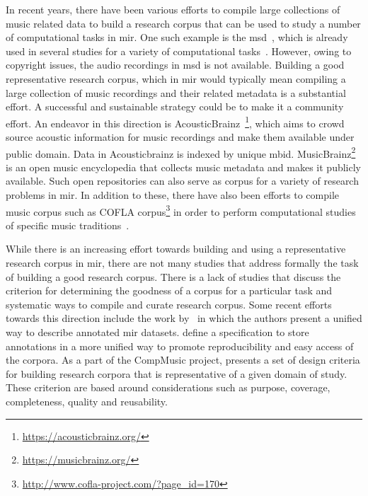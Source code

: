 In recent years, there have been various efforts to compile large collections of music related data to build a research corpus that can be used to study a number of computational tasks in \gls{mir}. One such example is the \gls{msd}~\citep{Bertin-Mahieux2011}, which is already used in several studies for a variety of computational tasks~\citep{serra2012measuring,sturm2012survey}. However, owing to copyright issues, the audio recordings in \gls{msd} is not available. Building a good representative research corpus, which in \gls{mir} would typically mean compiling a large collection of music recordings and their related metadata is a substantial effort. A successful and sustainable strategy could be to make it a community effort. An endeavor in this direction is AcousticBrainz~\citep{porter2015acousticbrainz}\footnote{\url{https://acousticbrainz.org/}}, which aims to crowd source acoustic information for music recordings and make them available under public domain. Data in Acousticbrainz is indexed by unique \gls{mbid}. MusicBrainz\footnote{\url{https://musicbrainz.org/}} is an open music encyclopedia that collects music metadata and makes it publicly available. Such open repositories can also serve as corpus for a variety of research problems in \gls{mir}. In addition to these, there have also been efforts to compile music corpus such as COFLA corpus\footnote{\url{http://www.cofla-project.com/?page_id=170}} in order to perform computational studies of specific music traditions~\citep{kroher2016corpus}.

While there is an increasing effort towards building and using a representative research corpus in \gls{mir}, there are not many studies that address formally the task of building a good research corpus. There is a lack of studies that discuss the criterion for determining the goodness of a corpus for a particular task and systematic ways to compile and curate research corpus. Some recent efforts towards this direction include the work by~\cite{peeters2012towards} in which the authors present a unified way to describe annotated \Gls{mir} datasets. \cite{Humphrey:JAMS:ISMIR:14} define a specification to store annotations in a more unified way to promote reproducibility and easy access of the corpora. As a part of the CompMusic project, \cite{serra:14:corpus} presents a set of design criteria for building research corpora that is representative of a given domain of study. These criterion are based around considerations such as purpose, coverage, completeness, quality and reusability.

